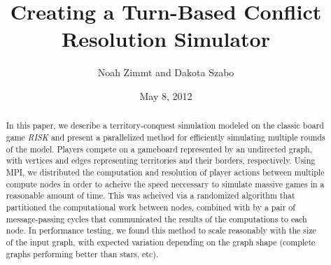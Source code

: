 \documentclass[10pt]{article}
\title{
	\textbf{
		Creating a Turn-Based Conflict Resolution Simulator
	}
}
\author{Noah Zimmt and Dakota Szabo}
\date{May 8, 2012}
\begin{document}
	\maketitle
	\begin{abstract}
		In this paper, we describe a territory-conquest simulation modeled on the classic board game \emph{RISK} and present a parallelized method for efficiently simulating multiple rounds of the model. 
		Players compete on a gameboard represented by an undirected graph, with vertices and edges representing territories and their borders, respectively. 
		Using MPI, we distributed the computation and resolution of player actions between multiple compute nodes in order to acheive the speed neccessary to simulate massive games in a reasonable amount of time. 
		This was acheived via a randomized algorithm that partitioned the computational work between nodes, combined with by a pair of message-passing cycles that communicated the results of the computations to each node. 
		In performance testing, we found this method to scale reasonably with the size of the input graph, with expected variation depending on the graph shape (complete graphs performing better than stars, etc).
	\end{abstract}
\end{document}
